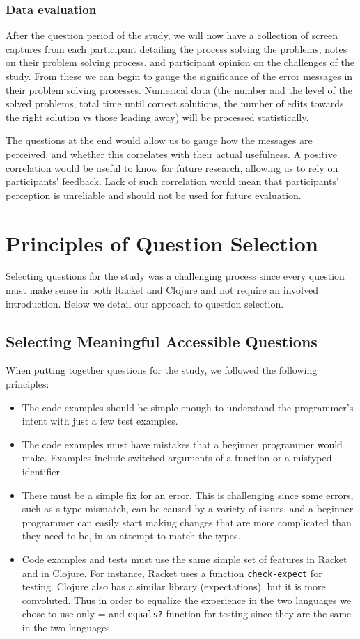 \documentclass[submission,copyright,creativecommons]{eptcs}
\begin{document}
\subsubsection{Data evaluation}\label{subsec:evaluation}

After the question period of the study, we will now have a collection of screen captures from each participant detailing the process solving the problems, notes on their problem solving process, and participant opinion on the challenges of the study.
From these we can begin to gauge the significance of the error messages in their problem solving processes. 
Numerical data (the number and the level of the solved problems, total time until correct solutions, the number of edits towards the right solution vs those leading away) will be processed statistically. 

The questions at the end would allow us to gauge how the messages are perceived, and whether this correlates with their actual usefulness. A positive correlation would be useful to know for future research, allowing us to rely on participants' feedback. 
Lack of such correlation would mean that participants' perception is unreliable and should not be used for future evaluation.  

\section{Principles of Question Selection}\label{sec:select}
	Selecting questions for the study was a challenging process since every question must make sense in both Racket and Clojure and not require an involved introduction. Below we detail our approach to question selection.

	\subsection{Selecting Meaningful Accessible Questions}\label{sec:meaning}
	When putting together questions for the study, we followed the following principles:
	\begin{itemize}
	\item The code examples should be simple enough to understand the programmer's intent with just a few test examples. 
	\item The code examples must have mistakes that a beginner programmer would make. Examples include switched arguments of a function or a mistyped identifier. 
	\item There must be a simple fix for an error. This is challenging since some errors, such as s type mismatch, can be caused by a variety of issues, and a beginner
	programmer can easily start making changes that are more complicated than they need to be, in an attempt to match the types. 
	\item Code examples and tests must use the same simple set of features in Racket and in Clojure. For instance, Racket uses a function \texttt{check-expect} for testing. Clojure also has a similar library (expectations), but it is more convoluted. Thus in order to equalize the experience in the two languages we chose to use only = and \texttt{equals?} function for testing since they are the same in the two languages. 
	\end{itemize}
\end{document}
